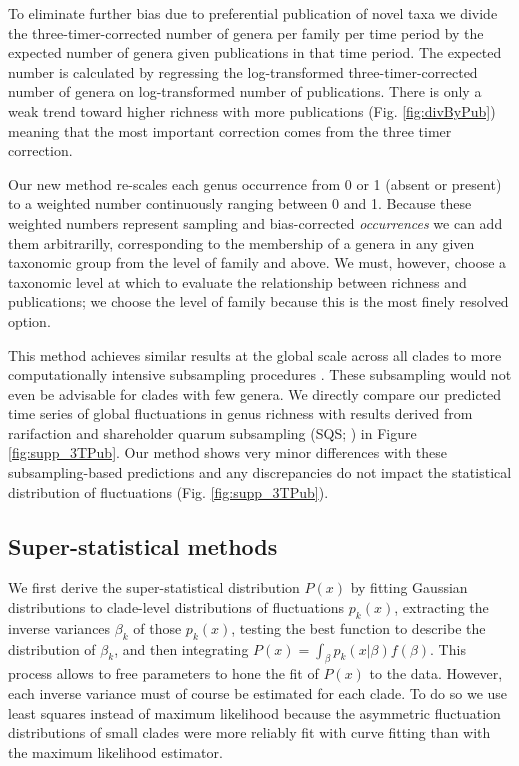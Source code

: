 \documentclass[12pt]{article}
\let\citep=\cite
\begin{document}
To eliminate further bias due to preferential publication of novel
taxa \citep{alroy2010} we divide the three-timer-corrected number of
genera per family per time period by the expected number of genera
given publications in that time period.  The expected number is
calculated by regressing the log-transformed three-timer-corrected
number of genera on log-transformed number of publications. There is
only a weak trend toward higher richness with more publications
(Fig. \ref{fig:divByPub}) meaning that the most important correction
comes from the three timer correction.

Our new method re-scales each genus occurrence from 0 or 1 (absent or
present) to a weighted number continuously ranging between 0 and
1. Because these weighted numbers represent sampling and
bias-corrected {\it occurrences} we can add them arbitrarilly,
corresponding to the membership of a genera in any given taxonomic
group from the level of family and above.  We must, however, choose a
taxonomic level at which to evaluate the relationship between richness
and publications; we choose the level of family because this is the
most finely resolved option.

This method achieves similar results at the global scale across all
clades to more computationally intensive subsampling procedures
\citep{miller1996, alroy2010, kocsis2018}. These subsampling would not
even be advisable for clades with few genera. We directly compare our
predicted time series of global fluctuations in genus richness with
results derived from rarifaction and shareholder quarum subsampling
(SQS; \citep{kocsis2018}) in Figure \ref{fig:supp_3TPub}.  Our method
shows very minor differences with these subsampling-based predictions
and any discrepancies do not impact the statistical distribution of
fluctuations (Fig. \ref{fig:supp_3TPub}).


\subsection*{Super-statistical methods} \label{sec:numMeth}



We first derive the super-statistical distribution $P(x)$ by fitting
Gaussian distributions to clade-level distributions of fluctuations
$p_k(x)$, extracting the inverse variances $\beta_k$ of those
$p_k(x)$, testing the best function to describe the distribution of
$\beta_k$, and then integrating
$P(x) = \int_{\beta}p_k(x | \beta) f(\beta)$. This process allows to
free parameters to hone the fit of $P(x)$ to the data.  However, each
inverse variance must of course be estimated for each clade.  To do so
we use least squares instead of maximum likelihood because the
asymmetric fluctuation distributions of small clades were more
reliably fit with curve fitting than with the maximum likelihood
estimator.
\end{document}
